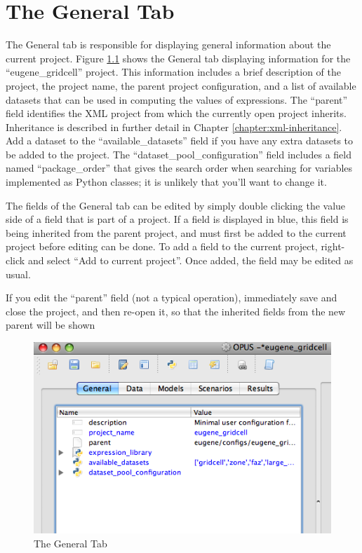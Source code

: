\chapter{The General Tab}

The General tab is responsible for displaying general information about the
current project.  Figure \ref{fig:general} shows the General tab displaying
information for the ``eugene\_gridcell'' project.  This information
includes a brief description of the project, the project name, the parent
project configuration, and a list of available datasets that can be used in
computing the values of expressions.  The ``parent'' field identifies the
XML project from which the currently open project inherits.  Inheritance is
described in further detail in Chapter \ref{chapter:xml-inheritance}.  Add
a dataset to the ``available\_datasets'' field if you have any extra
datasets to be added to the project.  The ``dataset\_pool\_configuration''
field includes a field named ``package\_order'' that gives the search order
when searching for variables implemented as Python classes; it is unlikely
that you'll want to change it.

The fields of the General tab can be edited by simply double clicking the
value side of a field that is part of a project.  If a field is displayed
in blue, this field is being inherited from the parent project, and must
first be added to the current project before editing can be done. To add a
field to the current project, right-click and select ``Add to current
project''.  Once added, the field may be edited as usual.

If you edit the ``parent'' field (not a typical operation), immediately
save and close the project, and then re-open it, so that the inherited
fields from the new parent will be shown

\begin{figure}[htp]
\begin{center}
\includegraphics[scale=0.6]{part-gui/images/general-tab.png}
\end{center}
\caption{The General Tab}
\label{fig:general}
\end{figure}

